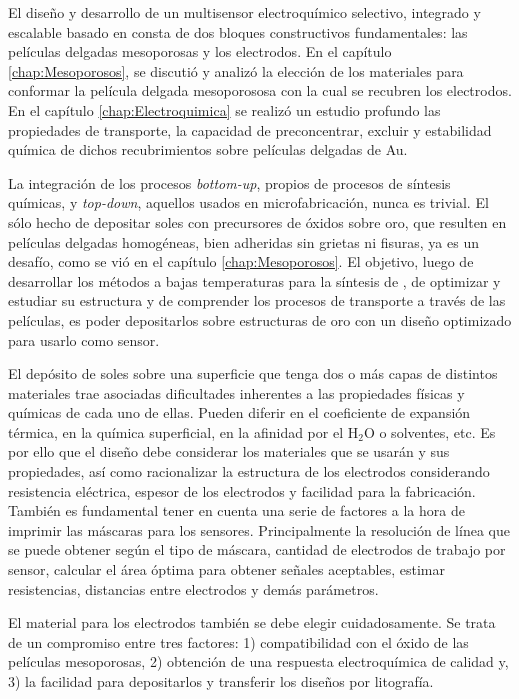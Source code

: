 	El diseño y desarrollo de un multisensor electroquímico selectivo, integrado y escalable basado en \pdm\space consta de dos bloques constructivos fundamentales: las películas delgadas mesoporosas y los electrodos. En el capítulo \ref{chap:Mesoporosos}, se discutió y analizó la elección de los materiales para conformar la película delgada mesoporososa con la cual se recubren los electrodos. En el capítulo \ref{chap:Electroquimica} se realizó un estudio profundo las propiedades de transporte, la capacidad de preconcentrar, excluir y estabilidad química de dichos recubrimientos sobre películas delgadas de Au.

	La integración de los procesos \textit{bottom-up}, propios de procesos de síntesis químicas, y \textit{top-down}, aquellos usados en microfabricación, nunca es trivial. El sólo hecho de depositar soles con precursores de óxidos sobre oro, que resulten en películas delgadas homogéneas, bien adheridas sin grietas ni fisuras, ya es un desafío, como se vió en el capítulo \ref{chap:Mesoporosos}. El objetivo, luego de desarrollar los métodos a bajas temperaturas para la síntesis de \pdm, de optimizar y estudiar su estructura y de comprender los procesos de transporte a través de las películas, es poder depositarlos sobre estructuras de oro con un diseño optimizado para usarlo como sensor. 

	El depósito de soles sobre una superficie que tenga dos o más capas de distintos  materiales trae asociadas dificultades inherentes a las propiedades físicas y químicas de cada uno de ellas. Pueden diferir en el coeficiente de expansión térmica, en la química superficial, en la afinidad por el H$_2$O o solventes, etc.
	Es por ello que el diseño debe considerar los materiales que se usarán y sus propiedades, así como racionalizar la estructura de los electrodos considerando resistencia eléctrica, espesor de los electrodos y facilidad para la fabricación. También es fundamental tener en cuenta una serie de factores a la hora de imprimir las máscaras para los sensores. Principalmente la resolución de línea que se puede obtener según el tipo de máscara, cantidad de electrodos de trabajo por sensor, calcular el área óptima para obtener señales aceptables, estimar resistencias, distancias entre electrodos y demás parámetros.

	El material para los electrodos también se debe elegir cuidadosamente. Se trata de un compromiso entre tres factores: 1) compatibilidad con el óxido de las películas mesoporosas, 2) obtención de una respuesta electroquímica de calidad y, 3) la facilidad para depositarlos y transferir los diseños por litografía.

